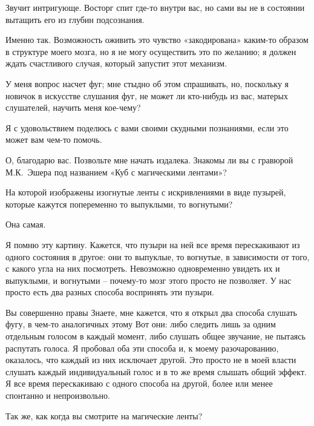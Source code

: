 \documentclass[../main.tex]{subfiles}
\begin{document}
\begin{dialogue}
 Звучит интригующе. Восторг спит где-то внутри вас, но сами вы не в состоянии вытащить его из глубин подсознания.

 Именно так. Возможность оживить это чувство «закодирована» каким-то образом в структуре моего мозга, но я не могу осуществить это по желанию; я должен ждать счастливого случая, который запустит этот механизм.

 У меня вопрос насчет фуг; мне стыдно об этом спрашивать, но, поскольку я новичок в искусстве слушания фуг, не может ли кто-нибудь из вас, матерых слушателей, научить меня кое-чему?

 Я с удовольствием поделюсь с вами своими скудными познаниями, если это может вам чем-то помочь.

 О, благодарю вас. Позвольте мне начать издалека. Знакомы ли вы с гравюрой М.К.~Эшера под названием «Куб с магическими лентами»?


 На которой изображены изогнутые ленты с искривлениями в виде пузырей, которые кажутся попеременно то выпуклыми, то вогнутыми?

 Она самая.

 Я помню эту картину. Кажется, что пузыри на ней все время перескакивают из одного состояния в другое: они то выпуклые, то вогнутые, в зависимости от того, с какого угла на них посмотреть. Невозможно одновременно увидеть их и выпуклыми, и вогнутыми \--- почему-то мозг этого просто не позволяет. У нас просто есть два разных способа воспринять эти пузыри.

 Вы совершенно правы Знаете, мне кажется, что я открыл два способа слушать фугу, в чем-то аналогичных этому Вот они: либо следить лишь за одним отдельным голосом в каждый момент, либо слушать общее звучание, не пытаясь распутать голоса. Я пробовал оба эти способа и, к моему разочарованию, оказалось, что каждый из них исключает другой. Это просто не в моей власти слушать каждый индивидуальный голос и в то же время слышать общий эффект. Я все время перескакиваю с одного способа на другой, более или менее спонтанно и непроизвольно.

 Так же, как когда вы смотрите на магические ленты?


\end{dialogue}
\end{document}
